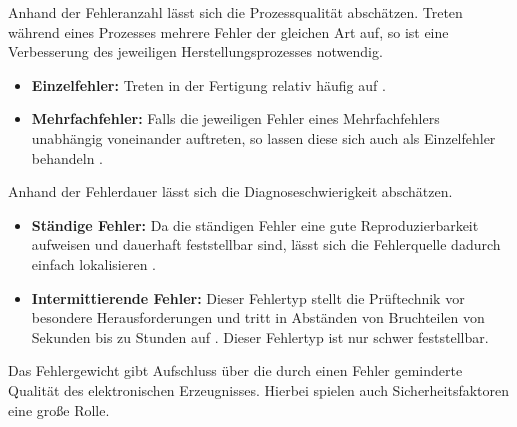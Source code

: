         Anhand der Fehleranzahl lässt sich die Prozessqualität abschätzen.
        Treten während eines Prozesses mehrere Fehler der gleichen Art auf, so ist eine Verbesserung des jeweiligen Herstellungsprozesses notwendig.

        \begin{itemize}
            \item \textbf{Einzelfehler:} Treten in der Fertigung relativ häufig auf \cite{karger_pruftechnik_1985}.
            \item \textbf{Mehrfachfehler:} Falls die jeweiligen Fehler eines Mehrfachfehlers unabhängig voneinander auftreten, so lassen diese sich auch als Einzelfehler behandeln \cite{karger_pruftechnik_1985}.
        \end{itemize}
        
        Anhand der Fehlerdauer lässt sich die Diagnoseschwierigkeit abschätzen.

        \begin{itemize}
            \item \textbf{Ständige Fehler:} Da die ständigen Fehler eine gute Reproduzierbarkeit aufweisen und dauerhaft feststellbar sind, lässt sich die Fehlerquelle dadurch einfach lokalisieren \cite{karger_pruftechnik_1985}.
            \item \textbf{Intermittierende Fehler:} Dieser Fehlertyp stellt die Prüftechnik vor besondere Herausforderungen und tritt in Abständen von Bruchteilen von Sekunden bis zu Stunden auf \cite{karger_pruftechnik_1985}. Dieser Fehlertyp ist nur schwer feststellbar.
        \end{itemize}

        Das Fehlergewicht gibt Aufschluss über die durch einen Fehler geminderte Qualität des elektronischen Erzeugnisses.
        Hierbei spielen auch Sicherheitsfaktoren eine große Rolle.

